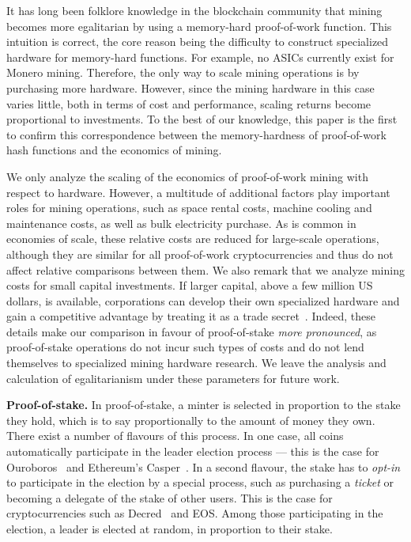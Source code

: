 It has long been folklore knowledge in the blockchain community that mining
becomes more egalitarian by using a memory-hard proof-of-work function. This
intuition is correct, the core reason being the difficulty to construct
specialized hardware for memory-hard functions. For example, no ASICs
currently exist for Monero mining.  Therefore, the only way to scale mining
operations is by purchasing more hardware. However, since the mining hardware
in this case varies little, both in terms of cost and performance, scaling
returns become proportional to investments.  To the best of our knowledge, this
paper is the first to confirm this correspondence between the
memory-hardness of proof-of-work hash functions and the economics of mining.

\begin{remark}\label{rmk:pow-scale}
We only analyze the scaling of the economics of proof-of-work mining with
respect to hardware. However, a multitude of
additional factors play important roles for mining operations, such as
space rental costs, machine cooling and maintenance costs, as well as bulk
electricity purchase.  As is common in economies of scale, these relative
costs are reduced for large-scale operations, although they are similar for
all proof-of-work cryptocurrencies and thus do not affect relative
comparisons between them. We also remark that we analyze mining costs for
small capital investments. If larger capital, \eg above a few million US
dollars, is available, corporations can develop their own specialized
hardware and gain a competitive advantage by treating it as a trade secret~\cite{taylor2013bitcoin}.
Indeed, these details make our comparison in favour of proof-of-stake
\emph{more pronounced}, as proof-of-stake operations do not incur such
types of costs and do not lend themselves to specialized mining hardware
research. We leave the analysis and calculation of egalitarianism under
these parameters for future work.
\end{remark}

\noindent\textbf{Proof-of-stake.}
In proof-of-stake, a minter is selected in proportion to the stake they hold,
which is to say proportionally to the amount of money they own. There exist a
number of flavours of this process. In one case, all coins automatically
participate in the leader election process --- this is the case for Ouroboros~\cite{C:KRDO17} and
Ethereum's Casper~\cite{buterin2017casper}. In a second flavour, the stake has
to \emph{opt-in} to participate in the election by a special process, such as
purchasing a \emph{ticket} or becoming a delegate of the stake of other users.
This is the case for cryptocurrencies such as Decred~\cite{decred} and EOS. Among those
participating in the election, a leader is elected at random, in proportion to
their stake.

